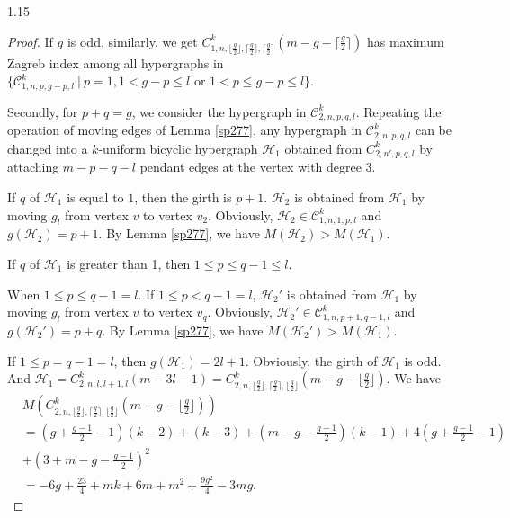 \documentclass[preprint,12pt]{elsarticle1}
\numberwithin{equation}{section}
\begin{document}
\begin{spacing}{1.15}
\begin{proof}
If $g$ is odd, similarly, we get $C_{1,n,\lfloor\frac{g}{2}\rfloor,\lceil\frac{g}{2}\rceil,\lceil\frac{g}{2}\rceil}^{k}(m-g-\lceil\frac{g}{2}\rceil)$ has maximum Zagreb index among all hypergraphs  in $\{\mathcal{C}_{1,n,p,g-p,l}^{k}~|~ p=1,1<g-p\leq l \text{~or~} 1<p\leq g-p\leq l\}$.

Secondly, for $p+q=g$, we consider the hypergraph in $\mathcal{C}_{2,n,p,q,l}^{k}$. Repeating the operation of moving edges of Lemma \ref{sp277}, any hypergraph in $\mathcal{C}_{2,n,p,q,l}^{k}$ can be changed into a $k$-uniform bicyclic hypergraph $\mathcal{H}_{1}$
obtained from $C_{2,n',p,q,l}^{k}$ by attaching $m-p-q-l$ pendant edges at the vertex with degree 3.

If $q$ of $\mathcal{H}_{1}$ is equal to $1$, then the girth is $p+1$.
$\mathcal{H}_{2}$ is obtained from $\mathcal{H}_{1}$ by moving $g_{l}$
from vertex $v$ to vertex $v_{2}$. Obviously, $\mathcal{H}_{2}\in \mathcal{C}_{1,n,1,p,l}^{k}$ and $g(\mathcal{H}_{2})=p+1$. By Lemma \ref{sp277}, we have $ M(\mathcal{H}_{2})>M(\mathcal{H}_{1})$.

If $q$ of $\mathcal{H}_{1}$ is greater than 1, then $1\leq p\leq q-1\leq l$.

When $1\leq p\leq q-1=l$.
If $1\leq p<q-1=l$, $\mathcal{H}_{2}'$ is obtained from $\mathcal{H}_{1}$ by moving $g_{l}$
from vertex $v$ to vertex $v_{q}$. Obviously, $\mathcal{H}_{2}'\in \mathcal{C}_{1,n,p+1,q-1,l}^{k}$ and $g(\mathcal{H}_{2}')=p+q$. By Lemma \ref{sp277}, we have $ M(\mathcal{H}_{2}')>M(\mathcal{H}_{1})$.

If $1\leq p=q-1=l$, then $g(\mathcal{H}_{1})=2l+1$. Obviously, the girth of $\mathcal{H}_{1}$ is odd. And $\mathcal{H}_{1}=C_{2,n,l,l+1,l}^{k}(m-3l-1)=C_{2,n,\lfloor\frac{g}{2}\rfloor,\lceil\frac{g}{2}\rceil,\lfloor\frac{g}{2}\rfloor}^{k}(m-g-\lfloor\frac{g}{2}\rfloor)$. We have
\begin{align*}
&M(C_{2,n,\lfloor\frac{g}{2}\rfloor,\lceil\frac{g}{2}\rceil,\lfloor\frac{g}{2}\rfloor}^{k}(m-g-\lfloor\frac{g}{2}\rfloor))\\
&=(g+\frac{g-1}{2}-1)(k-2)+(k-3)+(m-g-\frac{g-1}{2})(k-1)+4(g+\frac{g-1}{2}-1)\\
&+(3+m-g-\frac{g-1}{2})^{2}\\
&=-6g+\frac{23}{4}+mk+6m+m^{2}+\frac{9g^{2}}{4}-3mg.
\end{align*}


\end{proof}
\end{spacing}
\end{document}
